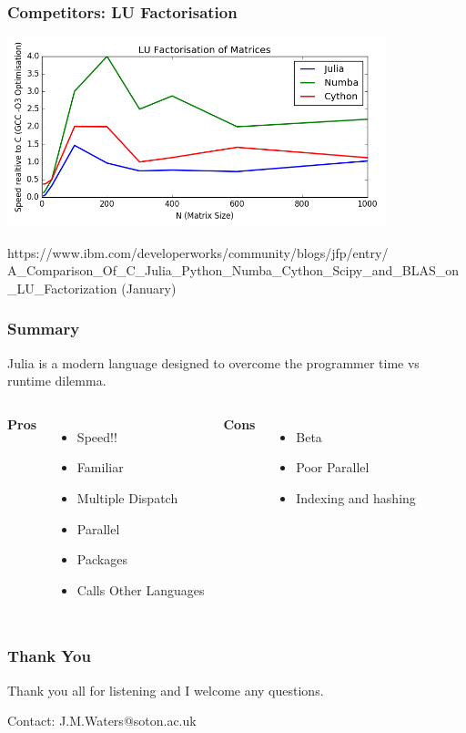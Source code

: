 \documentclass{beamer}
\begin{document}
\begin{frame}
	\frametitle{Competitors: LU Factorisation}

	\includegraphics[width=11cm]{Images/LU_fact.png}

	\tiny https://www.ibm.com/developerworks/community/blogs/jfp/entry/ A\_Comparison\_Of\_C\_Julia\_Python\_Numba\_Cython\_Scipy\_and\_BLAS\_on\_LU\_Factorization (January)
\end{frame}

\begin{frame}
	\frametitle{Summary}

	Julia is a modern language designed to overcome the programmer time vs runtime dilemma. \newline

	\begin{columns}
		\column[T]{6cm}
		\textbf{Pros}
		\begin{itemize}
			\item{Speed!!}
			\item Familiar
			\item Multiple Dispatch
			\item Parallel
			\item Packages
			\item Calls Other Languages
		\end{itemize}

		\column[T]{6cm}
		\textbf{Cons}
		\begin{itemize}
			\item Beta
			\item Poor Parallel
			\item Indexing and hashing
		\end{itemize}
	\end{columns}
\end{frame}

\begin{frame}
	\frametitle{Thank You}
	\begin{center}
		Thank you all for listening and I welcome any questions. \newline

		Contact: J.M.Waters@soton.ac.uk
	\end{center}
\end{frame}
\end{document}
